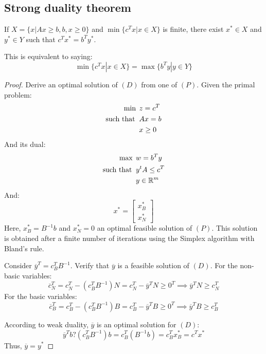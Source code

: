 \subsection{Strong duality theorem}
\begin{theorem}
    If $X=\{x|Ax \geq b, b,x \geq 0\}$ and $\min\{c^Tx|x \in X\}$ is finite, there exist $x^{*} \in X$ and $y^{*} \in Y$ such that $c^Tx^{*}=b^Ty^{*}$. 
\end{theorem}
This is equivalent to saying:
\[\min\{c^Tx|x \in X\}=\max\{b^Ty|y \in Y\}\]
\begin{proof}
    Derive an optimal solution of $(D)$ from one of $(P)$.
    Given the primal problem: 
    \begin{align*}
        \min                      \:&\: z=c^T            \\
        \textnormal{such that }     &\: Ax = b         \\
                                    &\: x \geq 0
    \end{align*}
    And its dual: 
    \begin{align*}
        \max                      \:&\: w=b^Ty              \\
        \textnormal{such that }     &\: y^tA \leq c^T       \\
                                    &\: y \in \mathbb{R}^m
    \end{align*}
    And: 
    \[x^{*}=\begin{bmatrix}
        x^{*}_B \\ 
        x^{*}_N
    \end{bmatrix}\]
    Here, $x^{*}_B=B^{-1}b$ and $x^{*}_N=0$ an optimal feasible solution of $(P)$. 
    This solution is obtained after a finite number of iterations using the Simplex algorithm with Bland's rule.  

    Consider $\overline{y}^T=c_B^TB^{-1}$.
    Verify that $\overline{y}$ is a feasible solution of $(D)$. 
    For the non-basic variables: 
    \[\overline{c}_N^T=c_N^T-(c_B^TB^{-1})N=c_N^T-\overline{y}^TN \geq 0^T \implies \overline{y}^TN \geq c_N^T\]
    For the basic variables: 
    \[\overline{c}_B^T=c_B^T-(c_B^TB^{-1})B=c_B^T-\overline{y}^TB \geq 0^T \implies \overline{y}^TB \geq c_B^T\]
    
    According to weak duality, $\overline{y}$ is an optimal solution for $(D)$: 
    \[\overline{y}^Tb?(c_B^TB^{-1})b=c_B^T(B^{-1}b)=c_B^Tx_B^{*}=c^Tx^{*}\]
    Thus, $\overline{y}=y^{*}$
\end{proof}

